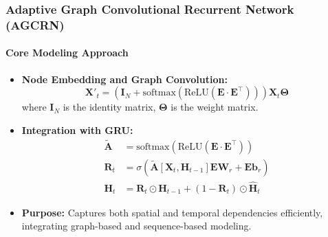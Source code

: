 \documentclass[light]{lutbeamer} %
\begin{document}
\begin{frame}
    \frametitle{Adaptive Graph Convolutional Recurrent Network (AGCRN)}
    \framesubtitle{Core Modeling Approach}
    \begin{itemize}
        \item \textbf{Node Embedding and Graph Convolution:}
              \[
                  \bm{X}'_t = \left(\bm{I}_N + \text{softmax}\left(\text{ReLU}\left(\bm{E} \cdot \bm{E}^\top\right)\right)\right) \bm{X}_t \bm{\Theta}
              \]
              where \(\bm{I}_N\) is the identity matrix, \(\bm{\Theta}\) is the weight matrix.
        \item \textbf{Integration with GRU:}
              \begin{align*}
                  \tilde{\bm{A}} & = \text{softmax}(\text{ReLU}(\bm{E} \cdot \bm{E}^\top))                         \\
                  \bm{R}_t       & = \sigma(\tilde{\bm{A}}[\bm{X}_t, \bm{H}_{t-1}]\bm{E}\bm{W}_r + \bm{E}\bm{b}_r) \\
                  \bm{H}_t       & = \bm{R}_t \odot \bm{H}_{t-1} + (1 - \bm{R}_t) \odot \hat{\bm{H}}_t
              \end{align*}
        \item \textbf{Purpose:} Captures both spatial and temporal dependencies efficiently, integrating graph-based and sequence-based modeling.
    \end{itemize}
\end{frame}
\end{document}
